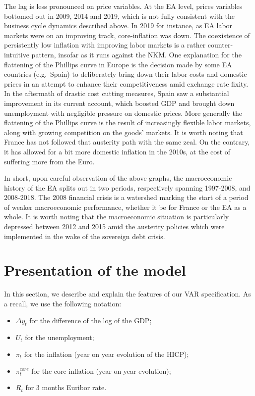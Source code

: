 \documentclass[
  11pt,
]{article}
\providecommand{\tightlist}{%
  \setlength{\itemsep}{0pt}\setlength{\parskip}{0pt}}
\begin{document}
The lag is less pronounced on price variables.
At the EA level, prices variables bottomed out in 2009, 2014 and 2019, which is not fully consistent with the business cycle dynamics described above.
In 2019 for instance, as EA labor markets were on an improving track, core-inflation was down.
The coexistence of persistently low inflation with improving labor markets is a rather counter-intuitive pattern, insofar as it runs against the NKM.
One explanation for the flattening of the Phillips curve in Europe is the decision made by some EA countries (e.g.~Spain) to deliberately bring down their labor costs and domestic prices in an attempt to enhance their competitiveness amid exchange rate fixity.
In the aftermath of drastic cost cutting measures, Spain saw a substantial improvement in its current account, which boosted GDP and brought down unemployment with negligible pressure on domestic prices.
More generally the flattening of the Phillips curve is the result of increasingly flexible labor markets, along with growing competition on the goods' markets.
It is worth noting that France has not followed that austerity path with the same zeal.
On the contrary, it has allowed for a bit more domestic inflation in the 2010s, at the cost of suffering more from the Euro.

In short, upon careful observation of the above graphs, the macroeconomic history of the EA splits out in two periods, respectively spanning 1997-2008, and 2008-2018.
The 2008 financial crisis is a watershed marking the start of a period of weaker macroeconomic performance, whether it be for France or the EA as a whole.
It is worth noting that the macroeconomic situation is particularly depressed between 2012 and 2015 amid the austerity policies which were implemented in the wake of the sovereign debt crisis.

\hypertarget{sec:model}{%
\section{Presentation of the model}\label{sec:model}}

In this section, we describe and explain the features of our VAR specification. As a recall, we use the following notation:

\begin{itemize}
\tightlist
\item
  \(\Delta y_t\) for the difference of the log of the GDP;
\item
  \(U_t\) for the unemployment;
\item
  \(\pi_t\) for the inflation (year on year evolution of the HICP);
\item
  \(\pi_t^{core}\) for the core inflation (year on year evolution);
\item
  \(R_t\) for 3 months Euribor rate.
\end{itemize}
\end{document}
